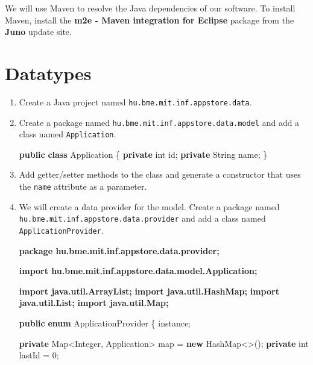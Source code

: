 \documentclass[]{report}
\newenvironment{Shaded}{}{}
\newcommand{\KeywordTok}[1]{\textcolor[rgb]{0.00,0.44,0.13}{\textbf{{#1}}}}
\newcommand{\DataTypeTok}[1]{\textcolor[rgb]{0.56,0.13,0.00}{{#1}}}
\newcommand{\DecValTok}[1]{\textcolor[rgb]{0.25,0.63,0.44}{{#1}}}
\newcommand{\NormalTok}[1]{{#1}}
\begin{document}
We will use Maven to resolve the Java dependencies of our software. To
install Maven, install the \textbf{m2e - Maven integration for Eclipse}
package from the \textbf{Juno} update site.

\section{Datatypes}

\begin{enumerate}
\def\labelenumi{\arabic{enumi}.}
\item
  Create a Java project named \texttt{hu.bme.mit.inf.appstore.data}.
\item
  Create a package named \texttt{hu.bme.mit.inf.appstore.data.model} and
  add a class named \texttt{Application}.

\begin{Shaded}
\begin{Highlighting}[]
\KeywordTok{public} \KeywordTok{class} \NormalTok{Application \{}
  \KeywordTok{private} \DataTypeTok{int} \NormalTok{id;}
  \KeywordTok{private} \NormalTok{String name;}
\NormalTok{\}}
\end{Highlighting}
\end{Shaded}
\item
  Add getter/setter methods to the class and generate a constructor that
  uses the \texttt{name} attribute as a parameter.
\item
  We will create a data provider for the model. Create a package named
  \texttt{hu.bme.mit.inf.appstore.data.provider} and add a class named
  \texttt{ApplicationProvider}.

\begin{Shaded}
\begin{Highlighting}[]
\KeywordTok{package hu.bme.mit.inf.appstore.data.provider;}

\KeywordTok{import hu.bme.mit.inf.appstore.data.model.Application;}

\KeywordTok{import java.util.ArrayList;}
\KeywordTok{import java.util.HashMap;}
\KeywordTok{import java.util.List;}
\KeywordTok{import java.util.Map;}

\KeywordTok{public} \KeywordTok{enum} \NormalTok{ApplicationProvider \{}
  \NormalTok{instance;}

  \KeywordTok{private} \NormalTok{Map<Integer, Application> map = }\KeywordTok{new} \NormalTok{HashMap<>();}
  \KeywordTok{private} \DataTypeTok{int} \NormalTok{lastId = }\DecValTok{0}\NormalTok{;}


\end{Highlighting}
\end{Shaded}
\end{enumerate}
\end{document}
